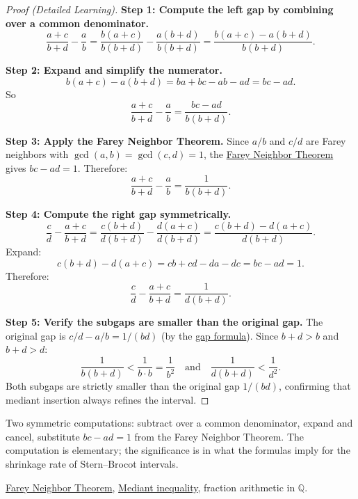 \begin{proof}[Proof (Detailed Learning)]
\textbf{Step 1: Compute the left gap by combining over a common denominator.}
\[
\frac{a+c}{b+d} - \frac{a}{b}
= \frac{b(a+c)}{b(b+d)} - \frac{a(b+d)}{b(b+d)}
= \frac{b(a+c) - a(b+d)}{b(b+d)}.
\]

\textbf{Step 2: Expand and simplify the numerator.}
\[
b(a+c) - a(b+d)
= ba + bc - ab - ad
= bc - ad.
\]
So
\[
\frac{a+c}{b+d} - \frac{a}{b} = \frac{bc - ad}{b(b+d)}.
\]

\textbf{Step 3: Apply the Farey Neighbor Theorem.}
Since $a/b$ and $c/d$ are Farey neighbors with $\gcd(a,b) = \gcd(c,d) = 1$,
the \hyperref[thm:farey-neighbor-theorem]{Farey Neighbor Theorem} gives
$bc - ad = 1$.  Therefore:
\[
\frac{a+c}{b+d} - \frac{a}{b} = \frac{1}{b(b+d)}.
\]

\textbf{Step 4: Compute the right gap symmetrically.}
\[
\frac{c}{d} - \frac{a+c}{b+d}
= \frac{c(b+d)}{d(b+d)} - \frac{d(a+c)}{d(b+d)}
= \frac{c(b+d) - d(a+c)}{d(b+d)}.
\]
Expand:
\[
c(b+d) - d(a+c)
= cb + cd - da - dc
= bc - ad = 1.
\]
Therefore:
\[
\frac{c}{d} - \frac{a+c}{b+d} = \frac{1}{d(b+d)}.
\]

\textbf{Step 5: Verify the subgaps are smaller than the original gap.}
The original gap is $c/d - a/b = 1/(bd)$ (by the
\hyperref[thm:farey-gap]{gap formula}).
Since $b + d > b$ and $b + d > d$:
\[
\frac{1}{b(b+d)} < \frac{1}{b \cdot b} = \frac{1}{b^2}
\quad\text{and}\quad
\frac{1}{d(b+d)} < \frac{1}{d^2}.
\]
Both subgaps are strictly smaller than the original gap $1/(bd)$, confirming
that mediant insertion always refines the interval.
\end{proof}

\begin{remark*}
Two symmetric computations: subtract over a common denominator, expand and
cancel, substitute $bc - ad = 1$ from the Farey Neighbor Theorem.  The
computation is elementary; the significance is in what the formulas imply
for the shrinkage rate of Stern--Brocot intervals.
\end{remark*}

\begin{dependencies}
\hyperref[thm:farey-neighbor-theorem]{Farey Neighbor Theorem},
\hyperref[thm:mediant-inequality]{Mediant inequality},
fraction arithmetic in $\mathbb{Q}$.
\end{dependencies}

